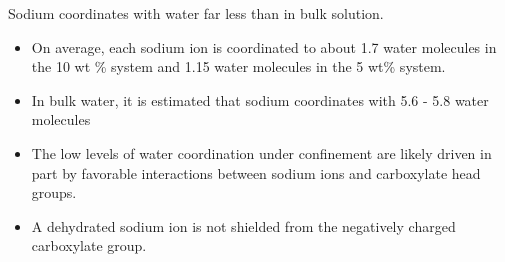 \documentclass{article}
\begin{document}
  \noindent Sodium coordinates with water far less than in bulk solution.
  \begin{itemize}
    \item On average, each sodium ion is coordinated to about 1.7 water molecules in 
    the 10 wt \% system and 1.15 water molecules in the 5 wt\% system.
    \item In bulk water, it is estimated that sodium coordinates with 5.6 - 5.8 water
    molecules~\cite{rowley_solvation_2012}
    \item The low levels of water coordination under confinement are likely driven
    in part by favorable interactions between sodium ions and carboxylate head groups.
    \item A dehydrated sodium ion is not shielded from the negatively charged carboxylate
    group.~\cite{ma_drastically_2019}
  \end{itemize}
  
\end{document}
